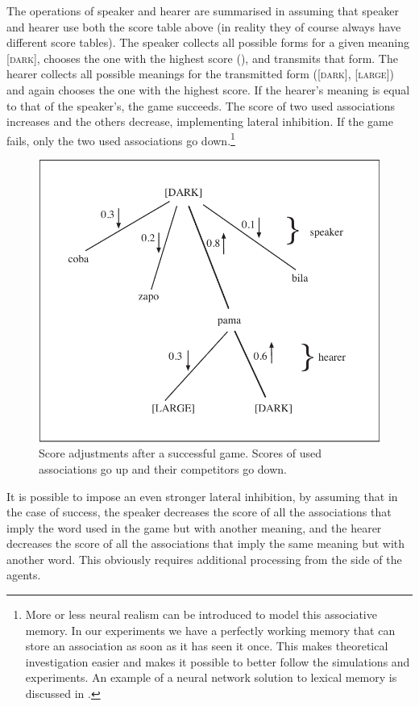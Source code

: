 The operations of speaker and hearer are summarised in 
 assuming that speaker and hearer
use both the score table above (in reality they of 
course always have different score tables). 
The speaker collects all possible
forms for a given meaning [\textsc{dark}], chooses the one with the
highest score (), and transmits that form. 
The hearer collects all possible meanings for 
the transmitted form ([\textsc{dark}], [\textsc{large}]) and again chooses the one with
the highest score. If the hearer's meaning is equal to that
of the speaker's, the game succeeds. The score of 
two used associations increases and the others
decrease, implementing lateral 
inhibition. If the game fails, only the two used associations 
go down.\footnote{More or less neural realism can be introduced to 
model this associative memory. In our experiments we 
have a perfectly working memory that can store an 
association as soon as it has seen it once. This makes
theoretical investigation easier and makes it possible
to better follow the simulations and experiments.  
An example of a neural network solution to lexical
memory is discussed in \cite{Cangelosi:1996}.}


\begin{figure}[htbp]
  \centerline{\includegraphics[width=.60\textwidth]{chap5/figs/incr-decr.pdf}}
\caption{\label{incr-decr}Score adjustments after a successful game. Scores of used 
associations go up and their competitors go down.}
\end{figure}

It is possible to impose an even stronger
lateral inhibition, by assuming that in the case of 
success, the speaker decreases the score of 
all the associations that imply the word used in 
the game but with another meaning, and the 
hearer decreases the score of all the associations
that imply the same meaning but with another 
word. This obviously requires additional processing
from the side of the agents. 

